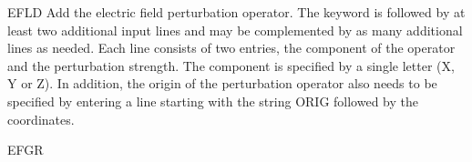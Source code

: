 \begin{keywordlist}
\item[EFLD]
Add the electric field perturbation operator.
The keyword is followed by at least two additional
input lines and may be complemented by as many additional lines as
needed. Each line consists of two entries, the component
of the operator and the perturbation strength. The component is
specified by a single letter (X, Y or Z).
In addition, the origin of the perturbation operator also needs to be specified
by entering a line starting with the string ORIG followed by the coordinates.
\item[EFGR]

\end{keywordlist}

